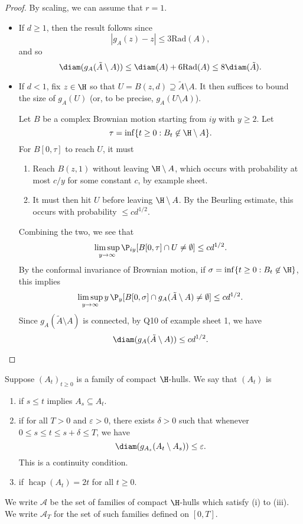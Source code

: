 \documentclass[a4paper]{article}
\DeclareMathOperator\hcap{hcap}
\newcommand\rad{\mathrm{Rad}}
\begin{document}
\begin{proof}
  By scaling, we can assume that $r = 1$.
  \begin{itemize}
    \item If $d \geq 1$, then the result follows since
      \[
        |g_A(z) - z| \leq 3 \rad(A),
      \]
      and so
      \[
        \diam(g_A(\tilde{A}\setminus A)) \leq \diam(A) + 6 \rad(A) \leq 8 \diam(\tilde{A}).
      \]
    \item If $d < 1$, fix $z \in \H$ so that $U = B(z, d) \supseteq \tilde{A} \setminus A$. It then suffices to bound the size of $g_A(U)$ (or, to be precise, $g_A(U \setminus A)$).

      Let $B$ be a complex Brownian motion starting from $iy$ with $y \geq 2$. Let
      \[
        \tau = \inf \{t \geq 0: B_t \not \in \H \setminus A\}.
      \]
      For $B[0, \tau]$ to reach $U$, it must
      \begin{enumerate}
        \item Reach $B(z, 1)$ without leaving $\H \setminus A$, which occurs with probability at most $c/y$ for some constant $c$, by example sheet.
        \item It must then hit $U$ before leaving $\H \setminus A$. By the Beurling estimate, this occurs with probability $\leq c d^{1/2}$.
      \end{enumerate}
      Combining the two, we see that
      \[
        \limsup_{y \to \infty} \P_{iy}[B[0, \tau] \cap U \not= \emptyset] \leq c d^{1/2}.
      \]
      By the conformal invariance of Brownian motion, if $\sigma = \inf \{t \geq 0 : B_t \not \in \H\}$, this implies
      \[
        \limsup_{y \to \infty} y\, \P_y [B[0, \sigma] \cap g_A(\tilde{A} \setminus A) \not= \emptyset] \leq c d^{1/2}.
      \]
      Since $g_A(\tilde{A} \setminus A)$ is connected, by Q10 of example sheet 1, we have
      \[
        \diam(g_A(\tilde{A} \setminus A)) \leq cd^{1/2}.\qedhere
      \]%
  \end{itemize}
\end{proof}

\begin{defi}
  Suppose $(A_t)_{t \geq 0}$ is a family of compact $\H$-hulls. We say that $(A_t)$ is
  \begin{enumerate}
    \item {} if $s \leq t$ implies $A_s \subseteq A_t$.
    \item {} if for all $T > 0$ and $\varepsilon > 0$, there exists $\delta > 0$ such that whenever $0 \leq s \leq t \leq s + \delta \leq T$, we have
      \[
        \diam(g_{A_s}(A_t \setminus A_s)) \leq \varepsilon.
      \]
      This is a continuity condition.
    \item {} if $\hcap(A_t) = 2t$ for all $t \geq 0$.
  \end{enumerate}
  We write $\mathcal{A}$ be the set of families of compact $\H$-hulls which satisfy (i) to (iii). We write $\mathcal{A}_T$ for the set of such families defined on $[0, T]$.
\end{defi}
\end{document}
